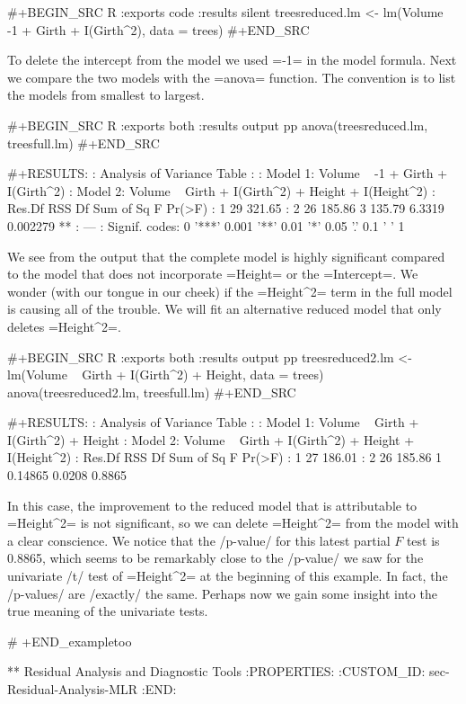 #+BEGIN_SRC R :exports code :results silent
treesreduced.lm <- lm(Volume ~ -1 + Girth + I(Girth^2), data = trees)
#+END_SRC

To delete the intercept from the model we used =-1= in the model
formula. Next we compare the two models with the =anova= function. The
convention is to list the models from smallest to largest.

#+BEGIN_SRC R :exports both :results output pp 
anova(treesreduced.lm, treesfull.lm)
#+END_SRC

#+RESULTS:
: Analysis of Variance Table
: 
: Model 1: Volume ~ -1 + Girth + I(Girth^2)
: Model 2: Volume ~ Girth + I(Girth^2) + Height + I(Height^2)
:   Res.Df    RSS Df Sum of Sq      F   Pr(>F)   
: 1     29 321.65                                
: 2     26 185.86  3    135.79 6.3319 0.002279 **
: ---
: Signif. codes:  0 '***' 0.001 '**' 0.01 '*' 0.05 '.' 0.1 ' ' 1

We see from the output that the complete model is highly significant
compared to the model that does not incorporate =Height= or the
=Intercept=. We wonder (with our tongue in our cheek) if the
=Height^2= term in the full model is causing all of the trouble. We
will fit an alternative reduced model that only deletes =Height^2=.

#+BEGIN_SRC R :exports both :results output pp 
treesreduced2.lm <- lm(Volume ~ Girth + I(Girth^2) + Height, 
                       data = trees)
anova(treesreduced2.lm, treesfull.lm)
#+END_SRC

#+RESULTS:
: Analysis of Variance Table
: 
: Model 1: Volume ~ Girth + I(Girth^2) + Height
: Model 2: Volume ~ Girth + I(Girth^2) + Height + I(Height^2)
:   Res.Df    RSS Df Sum of Sq      F Pr(>F)
: 1     27 186.01                           
: 2     26 185.86  1   0.14865 0.0208 0.8865

In this case, the improvement to the reduced model that is
attributable to =Height^2= is not significant, so we can delete
=Height^2= from the model with a clear conscience. We notice that the
/p-value/ for this latest partial \(F\) test is 0.8865, which seems to
be remarkably close to the /p-value/ we saw for the univariate /t/
test of =Height^2= at the beginning of this example. In fact, the
/p-values/ are /exactly/ the same. Perhaps now we gain some insight
into the true meaning of the univariate tests.

# +END_exampletoo

** Residual Analysis and Diagnostic Tools
:PROPERTIES:
:CUSTOM_ID: sec-Residual-Analysis-MLR
:END:

